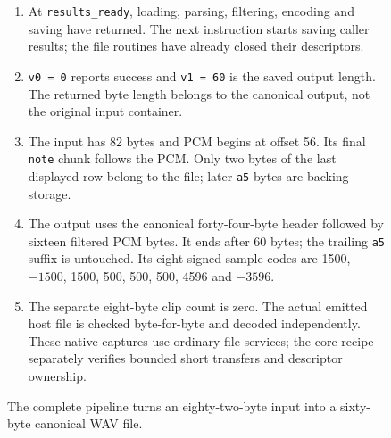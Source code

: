 \begin{figure}[htbp]
\begin{minipage}{\linewidth}
\begin{enumerate}
      \item At \texttt{results\_ready}, loading, parsing, filtering, encoding and saving have returned. The next instruction starts saving caller results; the file routines have already closed their descriptors.
      \item \texttt{v0 = 0} reports success and \texttt{v1 = 60} is the saved output length. The returned byte length belongs to the canonical output, not the original input container.
      \item The input has 82 bytes and PCM begins at offset 56. Its final \texttt{note} chunk follows the PCM. Only two bytes of the last displayed row belong to the file; later \texttt{a5} bytes are backing storage.
      \item The output uses the canonical forty-four-byte header followed by sixteen filtered PCM bytes. It ends after 60 bytes; the trailing \texttt{a5} suffix is untouched. Its eight signed sample codes are 1500, $-1500$, 1500, 500, 500, 500, 4596 and $-3596$.
      \item The separate eight-byte clip count is zero. The actual emitted host file is checked byte-for-byte and decoded independently. These native captures use ordinary file services; the core recipe separately verifies bounded short transfers and descriptor ownership.
    \end{enumerate}
  \end{minipage}
  \caption{The complete pipeline turns an eighty-two-byte input into a sixty-byte canonical WAV file.}
  \label{capture:031-pcm-wav-f05}
  \label{pcm-wav-f05}
\end{figure}
\par
